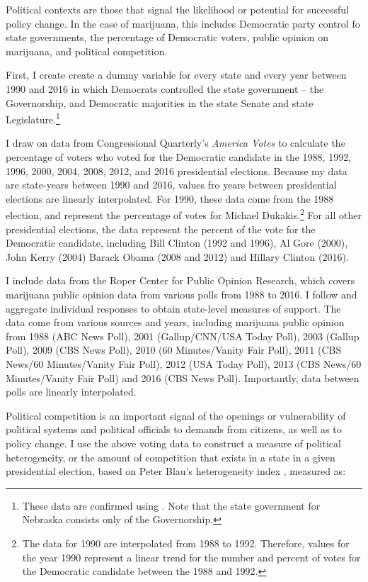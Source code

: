 Political contexts are those that signal the likelihood or potential for successful policy change. In the case of marijuana, this includes Democratic party control fo state governments, the percentage of Democratic voters, public opinion on marijuana, and political competition. 

First, I create create a dummy variable for every state and every year between 1990 and 2016 in which Democrats controlled the state government -- the Governorship, and Democratic majorities in the state Senate and state Legislature.\footnote{These data are confirmed using \citep{wiki_2019}. Note that the state government for Nebraska consists only of the Governorship.} 

I draw on data from Congressional Quarterly's {\it{America Votes}} to calculate the percentage of voters who voted for the Democratic candidate in the 1988, 1992, 1996, 2000, 2004, 2008, 2012, and 2016 presidential elections. Because my data are state-years between 1990 and 2016, values fro years between presidential elections are linearly interpolated. For 1990, these data come from the 1988 election, and represent the percentage of votes for Michael Dukakis.\footnote{The data for 1990 are interpolated from 1988 to 1992. Therefore, values for the year 1990 represent a linear trend for the number and percent of votes for the Democratic candidate between the 1988 and 1992.} For all other presidential elections, the data represent the percent of the vote for the Democratic candidate, including Bill Clinton (1992 and 1996), Al Gore (2000), John Kerry (2004) Barack Obama (2008 and 2012) and Hillary Clinton (2016). 

I include data from the Roper Center for Public Opinion Research, which covers marijuana public opinion data from various polls from 1988 to 2016. I follow \citep{weakliem_and_biggert_1999} and aggregate individual responses to obtain state-level measures of support. The data come from various sources and years, including marijuana public opinion from 1988 (ABC News Poll), 2001 (Gallup/CNN/USA Today Poll), 2003 (Gallup Poll), 2009 (CBS News Poll), 2010 (60 Minutes/Vanity Fair Poll), 2011 (CBS News/60 Minutes/Vanity Fair Poll), 2012 (USA Today Poll), 2013 (CBS News/60 Minutes/Vanity Fair Poll) and 2016 (CBS News Poll). Importantly, data between polls are linearly interpolated. 


Political competition is an important signal of the openings or vulnerability of political systems and political officials to demands from citizens, as well as to policy change. I use the above voting data to construct a measure of political heterogeneity, or the amount of competition that exists in a state in a given presidential election, based on Peter Blau's heterogeneity index \citep{blau_1977a}, measured as:

